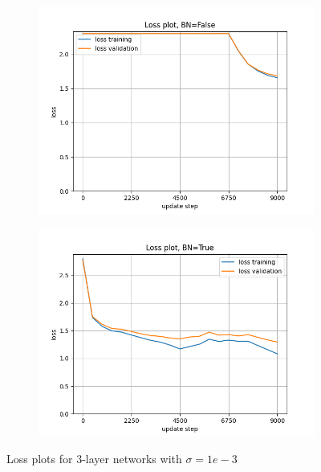 \documentclass[12pt, a4paper]{article}
\begin{document}
\begin{figure}[H]
    \centering
    \begin{subfigure}{0.45\textwidth}
        \centering
        \includegraphics[width=\textwidth]{results/2-2250-3-loss-False-0.001.png}
    \end{subfigure}
    \hfill
    \begin{subfigure}{0.45\textwidth}
        \centering
        \includegraphics[width=\textwidth]{results/2-2250-3-loss-True-0.001.png}
    \end{subfigure}
    \caption{Loss plots for 3-layer networks with $\sigma=1e-3$}
\end{figure}
\end{document}
